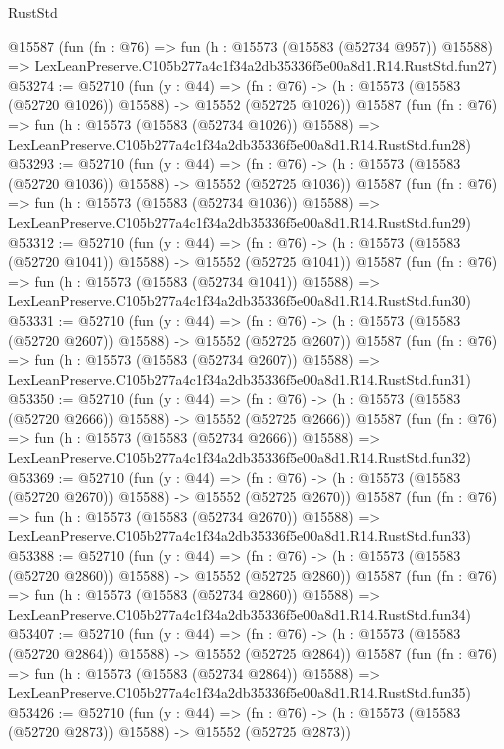 \begin{lexlean}{RustStd}
\begin{coremodule}
    @15587
    (fun (fn : @76) =>
    fun (h : @15573 (@15583 (@52734 @957)) @15588) =>
    LexLeanPreserve.C105b277a4c1f34a2db35336f5e00a8d1.R14.RustStd.fun27)
@53274 := @52710
    (fun (y : @44) =>
    (fn : @76) -> (h : @15573 (@15583 (@52720 @1026)) @15588) -> @15552 (@52725 @1026))
    @15587
    (fun (fn : @76) =>
    fun (h : @15573 (@15583 (@52734 @1026)) @15588) =>
    LexLeanPreserve.C105b277a4c1f34a2db35336f5e00a8d1.R14.RustStd.fun28)
@53293 := @52710
    (fun (y : @44) =>
    (fn : @76) -> (h : @15573 (@15583 (@52720 @1036)) @15588) -> @15552 (@52725 @1036))
    @15587
    (fun (fn : @76) =>
    fun (h : @15573 (@15583 (@52734 @1036)) @15588) =>
    LexLeanPreserve.C105b277a4c1f34a2db35336f5e00a8d1.R14.RustStd.fun29)
@53312 := @52710
    (fun (y : @44) =>
    (fn : @76) -> (h : @15573 (@15583 (@52720 @1041)) @15588) -> @15552 (@52725 @1041))
    @15587
    (fun (fn : @76) =>
    fun (h : @15573 (@15583 (@52734 @1041)) @15588) =>
    LexLeanPreserve.C105b277a4c1f34a2db35336f5e00a8d1.R14.RustStd.fun30)
@53331 := @52710
    (fun (y : @44) =>
    (fn : @76) -> (h : @15573 (@15583 (@52720 @2607)) @15588) -> @15552 (@52725 @2607))
    @15587
    (fun (fn : @76) =>
    fun (h : @15573 (@15583 (@52734 @2607)) @15588) =>
    LexLeanPreserve.C105b277a4c1f34a2db35336f5e00a8d1.R14.RustStd.fun31)
@53350 := @52710
    (fun (y : @44) =>
    (fn : @76) -> (h : @15573 (@15583 (@52720 @2666)) @15588) -> @15552 (@52725 @2666))
    @15587
    (fun (fn : @76) =>
    fun (h : @15573 (@15583 (@52734 @2666)) @15588) =>
    LexLeanPreserve.C105b277a4c1f34a2db35336f5e00a8d1.R14.RustStd.fun32)
@53369 := @52710
    (fun (y : @44) =>
    (fn : @76) -> (h : @15573 (@15583 (@52720 @2670)) @15588) -> @15552 (@52725 @2670))
    @15587
    (fun (fn : @76) =>
    fun (h : @15573 (@15583 (@52734 @2670)) @15588) =>
    LexLeanPreserve.C105b277a4c1f34a2db35336f5e00a8d1.R14.RustStd.fun33)
@53388 := @52710
    (fun (y : @44) =>
    (fn : @76) -> (h : @15573 (@15583 (@52720 @2860)) @15588) -> @15552 (@52725 @2860))
    @15587
    (fun (fn : @76) =>
    fun (h : @15573 (@15583 (@52734 @2860)) @15588) =>
    LexLeanPreserve.C105b277a4c1f34a2db35336f5e00a8d1.R14.RustStd.fun34)
@53407 := @52710
    (fun (y : @44) =>
    (fn : @76) -> (h : @15573 (@15583 (@52720 @2864)) @15588) -> @15552 (@52725 @2864))
    @15587
    (fun (fn : @76) =>
    fun (h : @15573 (@15583 (@52734 @2864)) @15588) =>
    LexLeanPreserve.C105b277a4c1f34a2db35336f5e00a8d1.R14.RustStd.fun35)
@53426 := @52710
    (fun (y : @44) =>
    (fn : @76) -> (h : @15573 (@15583 (@52720 @2873)) @15588) -> @15552 (@52725 @2873))

\end{coremodule}
\end{lexlean}
